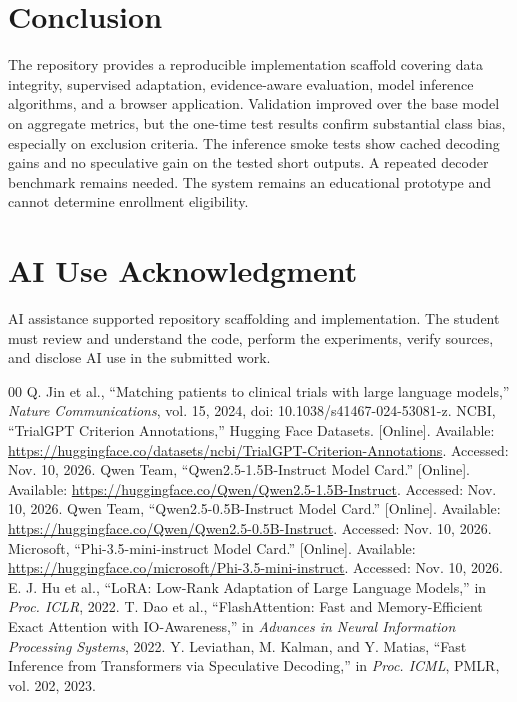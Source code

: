 \documentclass[conference]{IEEEtran}
\begin{document}
\section{Conclusion}
The repository provides a reproducible implementation scaffold covering data integrity, supervised adaptation, evidence-aware evaluation, model inference algorithms, and a browser application. Validation improved over the base model on aggregate metrics, but the one-time test results confirm substantial class bias, especially on exclusion criteria. The inference smoke tests show cached decoding gains and no speculative gain on the tested short outputs. A repeated decoder benchmark remains needed. The system remains an educational prototype and cannot determine enrollment eligibility.

\section*{AI Use Acknowledgment}
AI assistance supported repository scaffolding and implementation. The student must review and understand the code, perform the experiments, verify sources, and disclose AI use in the submitted work.

\begin{thebibliography}{00}
 Q. Jin et al., ``Matching patients to clinical trials with large language models,'' \emph{Nature Communications}, vol. 15, 2024, doi: 10.1038/s41467-024-53081-z.
 NCBI, ``TrialGPT Criterion Annotations,'' Hugging Face Datasets. [Online]. Available: \url{https://huggingface.co/datasets/ncbi/TrialGPT-Criterion-Annotations}. Accessed: Nov. 10, 2026.
 Qwen Team, ``Qwen2.5-1.5B-Instruct Model Card.'' [Online]. Available: \url{https://huggingface.co/Qwen/Qwen2.5-1.5B-Instruct}. Accessed: Nov. 10, 2026.
 Qwen Team, ``Qwen2.5-0.5B-Instruct Model Card.'' [Online]. Available: \url{https://huggingface.co/Qwen/Qwen2.5-0.5B-Instruct}. Accessed: Nov. 10, 2026.
 Microsoft, ``Phi-3.5-mini-instruct Model Card.'' [Online]. Available: \url{https://huggingface.co/microsoft/Phi-3.5-mini-instruct}. Accessed: Nov. 10, 2026.
 E. J. Hu et al., ``LoRA: Low-Rank Adaptation of Large Language Models,'' in \emph{Proc. ICLR}, 2022.
 T. Dao et al., ``FlashAttention: Fast and Memory-Efficient Exact Attention with IO-Awareness,'' in \emph{Advances in Neural Information Processing Systems}, 2022.
 Y. Leviathan, M. Kalman, and Y. Matias, ``Fast Inference from Transformers via Speculative Decoding,'' in \emph{Proc. ICML}, PMLR, vol. 202, 2023.
\end{thebibliography}
\end{document}
